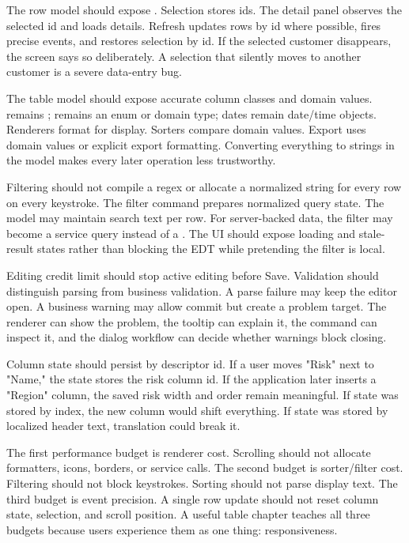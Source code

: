 The row model should expose . Selection stores ids. The detail panel observes the selected id and loads details. Refresh updates rows by id where possible, fires precise events, and restores selection by id. If the selected customer disappears, the screen says so deliberately. A selection that silently moves to another customer is a severe data-entry bug.

The table model should expose accurate column classes and domain values.  remains ;  remains an enum or domain type; dates remain date/time objects. Renderers format for display. Sorters compare domain values. Export uses domain values or explicit export formatting. Converting everything to strings in the model makes every later operation less trustworthy.

Filtering should not compile a regex or allocate a normalized string for every row on every keystroke. The filter command prepares normalized query state. The model may maintain search text per row. For server-backed data, the filter may become a service query instead of a . The UI should expose loading and stale-result states rather than blocking the EDT while pretending the filter is local.

Editing credit limit should stop active editing before Save. Validation should distinguish parsing from business validation. A parse failure may keep the editor open. A business warning may allow commit but create a problem target. The renderer can show the problem, the tooltip can explain it, the command can inspect it, and the dialog workflow can decide whether warnings block closing.

Column state should persist by descriptor id. If a user moves "Risk" next to "Name," the state stores the risk column id. If the application later inserts a "Region" column, the saved risk width and order remain meaningful. If state was stored by index, the new column would shift everything. If state was stored by localized header text, translation could break it.

The first performance budget is renderer cost. Scrolling should not allocate formatters, icons, borders, or service calls. The second budget is sorter/filter cost. Filtering should not block keystrokes. Sorting should not parse display text. The third budget is event precision. A single row update should not reset column state, selection, and scroll position. A useful table chapter teaches all three budgets because users experience them as one thing: responsiveness.

